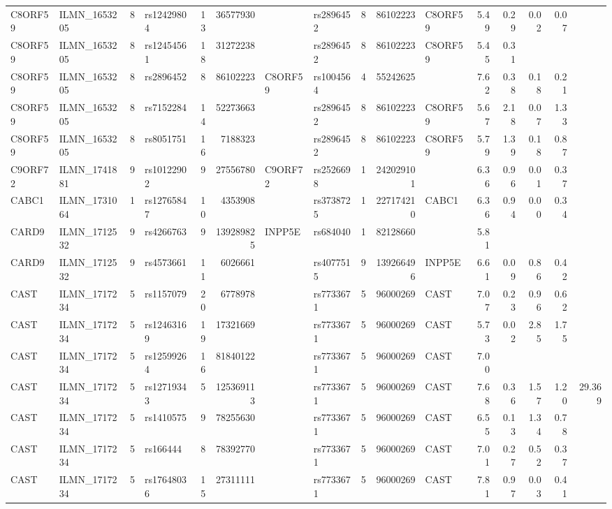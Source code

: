 \documentclass{article}
\begin{document}
\begin{landscape}
{\begin{ThreePartTable}
\begin{longtable}{|llr|lrrl|lrrl|rrrr|r|}
  C8ORF59 & ILMN\_1653205 & 8 & rs12429804 & 13 & 36577930 &  & rs2896452 & 8 & 86102223 & C8ORF59 & 5.49 & 0.29 & 0.02 & 0.07 &  \\
  C8ORF59 & ILMN\_1653205 & 8 & rs12454561 & 18 & 31272238 &  & rs2896452 & 8 & 86102223 & C8ORF59 & 5.45 & 0.31 &  &  &  \\
  C8ORF59 & ILMN\_1653205 & 8 & rs2896452 & 8 & 86102223 & C8ORF59 & rs1004564 & 4 & 55242625 &  & 7.62 & 0.38 & 0.18 & 0.21 &  \\
  C8ORF59 & ILMN\_1653205 & 8 & rs7152284 & 14 & 52273663 &  & rs2896452 & 8 & 86102223 & C8ORF59 & 5.67 & 2.18 & 0.07 & 1.33 &  \\
  C8ORF59 & ILMN\_1653205 & 8 & rs8051751 & 16 & 7188323 &  & rs2896452 & 8 & 86102223 & C8ORF59 & 5.79 & 1.39 & 0.18 & 0.87 &  \\
  C9ORF72 & ILMN\_1741881 & 9 & rs10122902 & 9 & 27556780 & C9ORF72 & rs2526698 & 1 & 242029101 &  & 6.36 & 0.96 & 0.01 & 0.37 &  \\
  CABC1 & ILMN\_1731064 & 1 & rs12765847 & 10 & 4353908 &  & rs3738725 & 1 & 227174210 & CABC1 & 6.36 & 0.94 & 0.00 & 0.34 &  \\
  CARD9 & ILMN\_1712532 & 9 & rs4266763 & 9 & 139289825 & INPP5E & rs684040 & 1 & 82128660 &  & 5.81 &  &  &  &  \\
  CARD9 & ILMN\_1712532 & 9 & rs4573661 & 11 & 6026661 &  & rs4077515 & 9 & 139266496 & INPP5E & 6.61 & 0.09 & 0.86 & 0.42 &  \\
  CAST & ILMN\_1717234 & 5 & rs1157079 & 20 & 6778978 &  & rs7733671 & 5 & 96000269 & CAST & 7.07 & 0.23 & 0.96 & 0.62 &  \\
  CAST & ILMN\_1717234 & 5 & rs12463169 & 19 & 17321669 &  & rs7733671 & 5 & 96000269 & CAST & 5.73 & 0.02 & 2.85 & 1.75 &  \\
  CAST & ILMN\_1717234 & 5 & rs12599264 & 16 & 81840122 &  & rs7733671 & 5 & 96000269 & CAST & 7.00 &  &  &  &  \\
  CAST & ILMN\_1717234 & 5 & rs12719343 & 5 & 125369113 &  & rs7733671 & 5 & 96000269 & CAST & 7.68 & 0.36 & 1.57 & 1.20 & 29.369 \\
  CAST & ILMN\_1717234 & 5 & rs1410575 & 9 & 78255630 &  & rs7733671 & 5 & 96000269 & CAST & 6.55 & 0.13 & 1.34 & 0.78 &  \\
  CAST & ILMN\_1717234 & 5 & rs166444 & 8 & 78392770 &  & rs7733671 & 5 & 96000269 & CAST & 7.01 & 0.27 & 0.52 & 0.37 &  \\
  CAST & ILMN\_1717234 & 5 & rs17648036 & 15 & 27311111 &  & rs7733671 & 5 & 96000269 & CAST & 7.81 & 0.97 & 0.03 & 0.41 &  \\

\end{longtable}
\end{ThreePartTable}}
\end{landscape}
\end{document}
